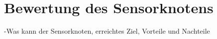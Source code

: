 \section{Bewertung des Sensorknotens}
-Was kann der Sensorknoten, erreichtes Ziel, Vorteile und Nachteile